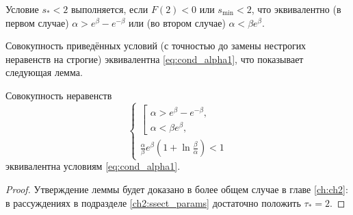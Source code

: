 
Условие $s_* < 2$ выполняется, если $F(2) < 0$ или $s_{\min} < 2$, что эквивалентно (в первом случае) $\alpha > e^{\beta} - e^{-\beta}$ или (во втором случае) $\alpha < \beta e^{\beta}$.

Совокупность приведённых условий (с точностью до замены нестрогих неравенств на строгие) эквивалентна \eqref{eq:cond_alpha1}, что показывает следующая лемма.

\begin{lemma}
\label{lm:parameter_constraints:ch1}
Совокупность неравенств 
\[
\begin{cases}
\left[
\begin{array}{ll}
	\alpha > e^{\beta} - e^{-\beta},\\
    \alpha < \beta e^{\beta},
\end{array}
\right.\\
\frac{\alpha}{\beta}e^{\beta}\left(1 + \ln\frac{\beta}{\alpha}\right) < 1
\end{cases}
\]
эквивалентна условиям \eqref{eq:cond_alpha1}.
\end{lemma}
\begin{proof}
	Утверждение леммы будет доказано в более общем случае в главе \ref{ch:ch2}: в рассуждениях в подразделе \ref{ch2:ssect_params} достаточно положить $\tau_* = 2$.
\end{proof}


